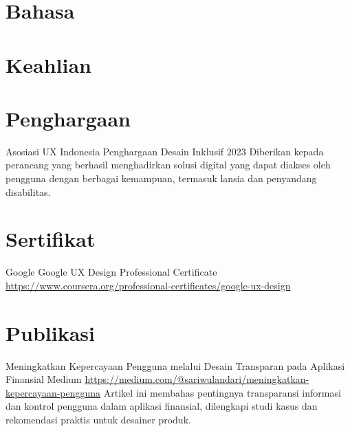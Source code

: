 \documentclass[a4paper, serif, 10pt]{moderncv}
\begin{document}
\section{Bahasa}

\section{Keahlian}

\section{Penghargaan}

        {Asosiasi UX Indonesia}
        {Penghargaan Desain Inklusif 2023}
        {}
        {}
        {Diberikan kepada perancang yang berhasil menghadirkan solusi digital yang dapat diakses oleh pengguna dengan berbagai kemampuan, termasuk lansia dan penyandang disabilitas.}
\section{Sertifikat}

        {Google}
        {Google UX Design Professional Certificate}
        {\url{https://www.coursera.org/professional-certificates/google-ux-design}}
        {}
        {}
\section{Publikasi}

        {Meningkatkan Kepercayaan Pengguna melalui Desain Transparan pada Aplikasi Finansial}
        {Medium}
        {\url{https://medium.com/@sariwulandari/meningkatkan-kepercayaan-pengguna}}
        {}
        {Artikel ini membahas pentingnya transparansi informasi dan kontrol pengguna dalam aplikasi finansial, dilengkapi studi kasus dan rekomendasi praktis untuk desainer produk.}
\end{document}
